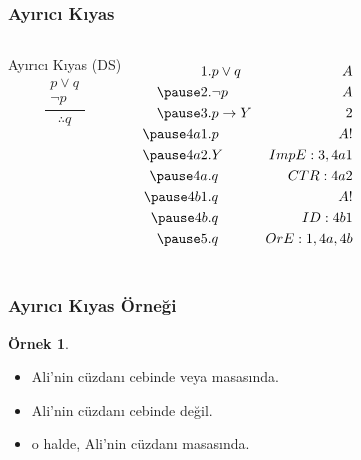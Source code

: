\documentclass[dvipsnames]{beamer}
\theoremstyle{definition}
\theoremstyle{example}
\newtheorem{ornek}[theorem]{Örnek}
\theoremstyle{plain}
\begin{document}
\begin{frame}
  \frametitle{Ayırıcı Kıyas}

  \begin{columns}
    \begin{block}{Ayırıcı Kıyas (DS)}
      \[
      \frac
        {
          \begin{array}{c}
            p \vee q\\
            \neg p
          \end{array}
        }
        {
          \therefore q
        }
      \]
    \end{block}

    \pause
    \begin{eqnarray*}
      1.   & p \vee q        & A\\
      \pause
      2.   & \neg p          & A\\
      \pause
      3.   & p \rightarrow Y & 2\\
      \pause
      4a1. & p               & A!\\
      \pause
      4a2. & Y               & ImpE:3,4a1\\
      \pause
      4a.  & q               & CTR:4a2\\
      \pause
      4b1. & q               & A!\\
      \pause
      4b.  & q               & ID:4b1\\
      \pause
      5.   & q               & OrE:1,4a,4b
    \end{eqnarray*}
  \end{columns}
\end{frame}

\begin{frame}
  \frametitle{Ayırıcı Kıyas Örneği}

  \begin{ornek}
    \begin{itemize}
      \item Ali'nin cüzdanı cebinde veya masasında.
      \item Ali'nin cüzdanı cebinde değil.

      \pause
      \medskip
      \item o halde, Ali'nin cüzdanı masasında.
    \end{itemize}
  \end{ornek}
\end{frame}
\end{document}
